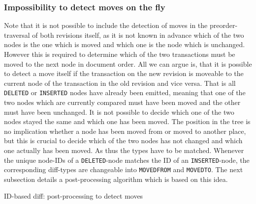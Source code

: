 \subsubsection{Impossibility to detect moves on the fly} Note that it is not possible to include the detection of moves in the preorder-traversal of both revisions itself, as it is not known in advance which of the two nodes is the one which is moved and which one is the node which is unchanged. However this is required to determine which of the two transactions must be moved to the next node in document order. All we can argue is, that it is possible to detect a move itself if the transaction on the new revision is moveable to the current node of the transaction in the old revision and vice versa. That is all \texttt{DELETED} or \texttt{INSERTED} nodes have already been emitted, meaning that one of the two nodes which are currently compared must have been moved and the other must have been unchanged. It is not possible to decide which one of the two nodes stayed the same and which one has been moved. The position in the tree is no implication whether a node has been moved from or moved to another place, but this is crucial to decide which of the two nodes has not changed and which one actually has been moved. As thus the types have to be matched. Whenever the unique node-IDs of a \texttt{DELETED}-node matches the ID of an \texttt{INSERTED}-node, the corresponding diff-types are changeable into \texttt{MOVEDFROM} and \texttt{MOVEDTO}. The next subsection details a post-processing algorithm which is based on this idea.

\begin{algorithm}[tb]
\BlankLine
{}
\caption{ID-based diff: post-processing to detect moves}\label{diffpost-processing}
\end{algorithm}


